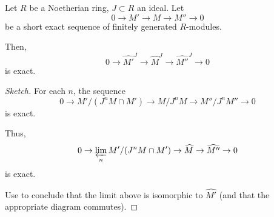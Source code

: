 \documentclass[12pt]{article}
\begin{document}
\begin{thm}
	Let $R$ be a Noetherian ring, $J \subset R$ an ideal. Let 
	\begin{equation*} 
		0 \to M' \to M \to M'' \to 0
	\end{equation*}
	be a short exact sequence of finitely generated $R$-modules.

	Then, 
	\begin{equation*} 
		0 \to \widehat{M'}^{J} \to \widehat{M}^{J} \to \widehat{M''}^{J} \to 0
	\end{equation*}
	is exact.
\end{thm}
\begin{proof}[Sketch]
	For each $n$, the sequence 
	\begin{equation*} 
		0 \to M'/(J^{n} M \cap M') \to M/J^{n} M \to M''/J^{n} M'' \to 0
	\end{equation*}
	is exact.

	Thus, 
	\begin{equation*} 
		0 \to \varprojlim_{n} M'/(J^{n} M \cap M') \to \widehat{M} \to \widehat{M''} \to 0
	\end{equation*}
	is exact.

	Use  to conclude that the limit above is isomorphic to $\widehat{M'}$ (and that the appropriate diagram commutes).
\end{proof}
\end{document}
